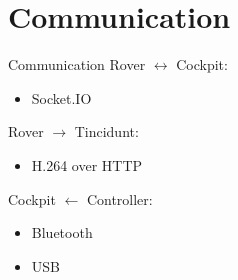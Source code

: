 \documentclass{beamer}
\begin{document}
\section{Communication}
\begin{frame}{Communication}
	Rover $\leftrightarrow$ Cockpit:
	\begin{itemize}
		\item Socket.IO
	\end{itemize}

	Rover $\rightarrow$ Tincidunt:
	\begin{itemize}
		\item H.264 over HTTP
	\end{itemize}

	Cockpit $\leftarrow$ Controller:
	\begin{itemize}
		\item Bluetooth
		\item USB
	\end{itemize}
\end{frame}
\end{document}
